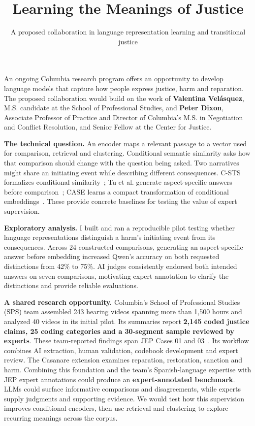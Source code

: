 \documentclass{article}
\title{Learning the Meanings of Justice}
\author{A proposed collaboration in language representation learning and transitional justice}
\begin{document}
\maketitle

An ongoing Columbia research program offers an opportunity to develop language models that capture how people express justice, harm and reparation. The proposed collaboration would build on the work of \textbf{Valentina Velásquez}, M.S. candidate at the School of Professional Studies, and \textbf{Peter Dixon}, Associate Professor of Practice and Director of Columbia's M.S. in Negotiation and Conflict Resolution, and Senior Fellow at the Center for Justice.

\textbf{The technical question.} An encoder maps a relevant passage to a vector used for comparison, retrieval and clustering. Conditional semantic similarity asks how that comparison should change with the question being asked. Two narratives might share an initiating event while describing different consequences. C-STS formalizes conditional similarity~\citep{deshpande2023}; Tu et al. generate aspect-specific answers before comparison~\citep{tu2024}; CASE learns a compact transformation of conditional embeddings~\citep{zhang2026}. These provide concrete baselines for testing the value of expert supervision.

\textbf{Exploratory analysis.} I built and ran a reproducible pilot testing whether language representations distinguish a harm’s initiating event from its consequences. Across 24 constructed comparisons, generating an aspect-specific answer before embedding increased Qwen’s accuracy on both requested distinctions from 42\% to 75\%. AI judges consistently endorsed both intended answers on seven comparisons, motivating expert annotation to clarify the distinctions and provide reliable evaluations.

\textbf{A shared research opportunity.} Columbia's School of Professional Studies (SPS) team assembled 243 hearing videos spanning more than 1,500 hours and analyzed 40 videos in its initial pilot. Its summaries report \textbf{2,145 coded justice claims, 25 coding categories and a 30-segment sample reviewed by experts}. These team-reported findings span JEP Cases 01 and 03~\citep{team}. Its workflow combines AI extraction, human validation, codebook development and expert review. The Casanare extension examines reparation, restoration, sanction and harm. Combining this foundation and the team's Spanish-language expertise with JEP expert annotations could produce an \textbf{expert-annotated benchmark}. LLMs could surface informative comparisons and disagreements, while experts supply judgments and supporting evidence. We would test how this supervision improves conditional encoders, then use retrieval and clustering to explore recurring meanings across the corpus.
\end{document}
